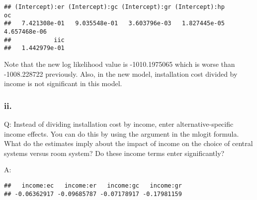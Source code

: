 \documentclass[
]{article}
\newenvironment{Shaded}{\begin{snugshade}}{\end{snugshade}}
\newcommand{\CommentTok}[1]{\textcolor[rgb]{0.56,0.35,0.01}{\textit{#1}}}
\newcommand{\DataTypeTok}[1]{\textcolor[rgb]{0.13,0.29,0.53}{#1}}
\newcommand{\DecValTok}[1]{\textcolor[rgb]{0.00,0.00,0.81}{#1}}
\newcommand{\KeywordTok}[1]{\textcolor[rgb]{0.13,0.29,0.53}{\textbf{#1}}}
\newcommand{\NormalTok}[1]{#1}
\newcommand{\OperatorTok}[1]{\textcolor[rgb]{0.81,0.36,0.00}{\textbf{#1}}}
\newcommand{\OtherTok}[1]{\textcolor[rgb]{0.56,0.35,0.01}{#1}}
\newcommand{\StringTok}[1]{\textcolor[rgb]{0.31,0.60,0.02}{#1}}
\begin{document}
\begin{verbatim}
## (Intercept):er (Intercept):gc (Intercept):gr (Intercept):hp             oc 
##   7.421308e-01   9.035548e-01   3.603796e-03   1.827445e-05   4.657468e-06 
##            iic 
##   1.442979e-01
\end{verbatim}

Note that the new log likelihood value is -1010.1975065 which is worse
than -1008.228722 previously. Also, in the new model, installation cost
divided by income is not significant in this model.

\hypertarget{ii.-2}{%
\subsubsection{ii.}\label{ii.-2}}

Q: Instead of dividing installation cost by income, enter
alternative-specific income effects. You can do this by using the
\texttt{\textbar{}} argument in the mlogit formula. What do the
estimates imply about the impact of income on the choice of central
systems versus room system? Do these income terms enter significantly?

A:

\begin{Shaded}
\end{Shaded}

\begin{verbatim}
##   income:ec   income:er   income:gc   income:gr 
## -0.06362917 -0.09685787 -0.07178917 -0.17981159
\end{verbatim}
\end{document}
